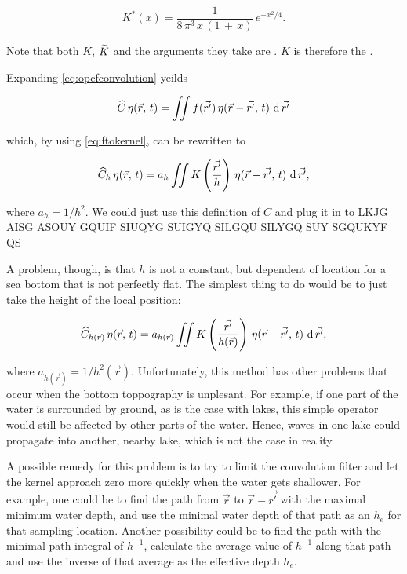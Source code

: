 \begin{equation}
K^*(x) = \frac{1}{8\,\pi^3\,x\,(1\,+\,x)}\,e^{-x^2/4}.
\end{equation}

Note that both $K$, $\widetilde{K}$ and the arguments they take are . $K$ is therefore the .

Expanding \eqref{eq:opcfconvolution} yeilds

\begin{equation} \label{eq:opcfintegral}
\widehat{C}\,\eta(\vec{r},\,t) = \iint f(\vec{r'})\,\eta(\vec{r}-\vec{r'},\,t)\,\operatorname{d}\vec{r'}
\end{equation}

which, by using \eqref{eq:ftokernel}, can be rewritten to

\begin{equation} \label{eq:opchunknown}
\widehat{C}_h\,\eta(\vec{r},\,t) = a_h\iint K\left(\frac{\vec{r'}}{h}\right)\,\eta(\vec{r}-\vec{r'},\,t)\,\operatorname{d}\vec{r'},
\end{equation}

where $a_h = 1/h^2$. We could just use this definition of $C$ and plug it in to LKJG AISG ASOUY GQUIF SIUQYG SUIGYQ SILGQU SILYGQ SUY SGQUKYF QS


A problem, though, is that $h$ is not a constant, but dependent of location for a sea bottom that is not perfectly flat. The simplest thing to do would be to just take the height of the local position:

\begin{equation} \label{eq:opchlocal}
\widehat{C}_{h(\vec{r})}\,\eta(\vec{r},\,t) = a_{h(\vec{r})}\iint K\left(\frac{\vec{r'}}{h(\vec{r})}\right)\,\eta(\vec{r}-\vec{r'},\,t)\,\operatorname{d}\vec{r'},
\end{equation}

where $a_{h(\vec{r})} = 1/h^2(\vec{r})$. Unfortunately, this method has other problems that occur when the bottom toppography is unplesant. For example, if one part of the water is surrounded by ground, as is the case with lakes, this simple operator would still be affected by other parts of the water. Hence, waves in one lake could propagate into another, nearby lake, which is not the case in reality.

A possible remedy for this problem is to try to limit the convolution filter and let the kernel approach zero more quickly when the water gets shallower. For example, one could be to find the path from $\vec{r}$ to $\vec{r}-\vec{r'}$ with the maximal minimum water depth, and use the minimal water depth of that path as an  $h_e$ for that sampling location. Another possibility could be to find the path with the minimal path integral of $h^{-1}$, calculate the average value of $h^{-1}$ along that path and use the inverse of that average as the effective depth $h_e$.

